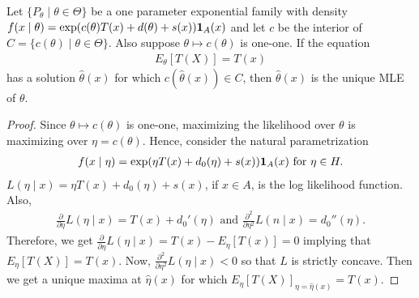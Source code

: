 \begin{theorem}
    Let $\{P_{\theta} \mid \theta \in \Theta\}$ be a one parameter exponential family with density $f(x \mid \theta) = \exp(c(\theta)T(x) + d(\theta) + s(x))\textbf{1}_{A}(x)$ and let $c$ be the interior of $C = \{c(\theta) \mid \theta \in \Theta\}$. Also suppose $\theta \mapsto c(\theta)$ is one-one. If the equation
    \begin{align}
        E_{\theta}[T(X)] = T(x)
    \end{align}
    has a solution $\hat{\theta}(x)$ for which $c(\hat{\theta}(x)) \in C$, then $\hat{\theta}(x)$ is the unique MLE of $\theta$.
\end{theorem}
\begin{proof}
    Since $\theta \mapsto c(\theta)$ is one-one, maximizing the likelihood over $\theta$ is maximizing over $\eta = c(\theta)$. Hence, consider the natural parametrization
    \begin{align}
        f(x \mid \eta) = \exp(\eta T(x) + d_{0}(\eta) + s(x))\textbf{1}_{A}(x) \text{ for } \eta \in H.
    \end{align}
    $L(\eta \mid x) = \eta T(x) + d_{0}(\eta) + s(x)$, if $x \in A$, is the log likelihood function. Also,
    \begin{align}
        \frac{\partial}{\partial \eta} L(\eta \mid x) = T(x) + d_{0}'(\eta) \text{ and } \frac{\partial^{2}}{\partial \eta^{2}} L(n \mid x) = d_{0}''(\eta).
    \end{align}
    Therefore, we get $\frac{\partial}{\partial \eta} L(\eta \mid x) = T(x) - E_{\eta}[T(x)] = 0$ implying that $E_{\eta}[T(X)] = T(x)$. Now, $\frac{\partial^{2}}{\partial \eta^{2}} L(\eta \mid x) < 0$ so that $L$ is strictly concave. Then we get a unique maxima at $\hat{\eta}(x)$ for which $E_{\eta}[T(X)]_{\eta = \hat{\eta}(x)} = T(x)$.
\end{proof}